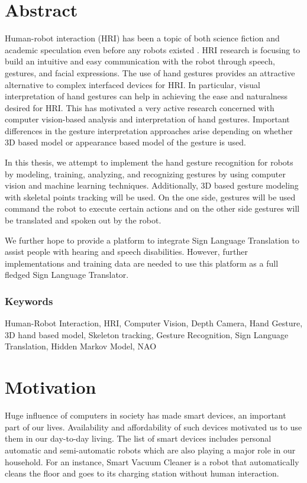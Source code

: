 \chapter{Abstract}
Human-robot interaction (HRI) has been a topic of both science fiction and academic speculation even before any robots existed \cite{7}. HRI research is focusing to build an intuitive and easy communication with the robot through speech, gestures, and facial expressions. The use of hand gestures provides an attractive alternative to complex interfaced devices for HRI. In particular, visual interpretation of hand gestures can help in achieving the ease and naturalness desired for HRI. This has motivated a very active research concerned with computer vision-based analysis and interpretation of hand gestures. Important differences in the gesture interpretation approaches arise depending on whether 3D based model or appearance based model of the gesture is used. 

In this thesis, we attempt to implement the hand gesture recognition for robots by modeling, training, analyzing, and recognizing gestures by using computer vision and machine learning techniques. Additionally, 3D based gesture modeling with skeletal points tracking will be used. On the one side, gestures will be used command the robot to execute certain actions and on the other side gestures will be translated and spoken out by the robot.

We further hope to provide a platform to integrate Sign Language Translation to assist people with hearing and speech disabilities. However, further implementations and training data are needed to use this platform as a full fledged Sign Language Translator.

\subsection*{Keywords} Human-Robot Interaction, HRI, Computer Vision, Depth Camera, Hand Gesture, 3D hand based model, Skeleton tracking, Gesture Recognition, Sign Language Translation, Hidden Markov Model, NAO

\chapter{Motivation} Huge influence of computers in society has made smart devices, an important part of our lives. Availability and affordability of such devices motivated us to use them in our day-to-day living. The list of smart devices includes personal automatic and semi-automatic robots which are also playing a major role in our household. For an instance, Smart Vacuum Cleaner is a robot that automatically cleans the floor and goes to its charging station without human interaction.

